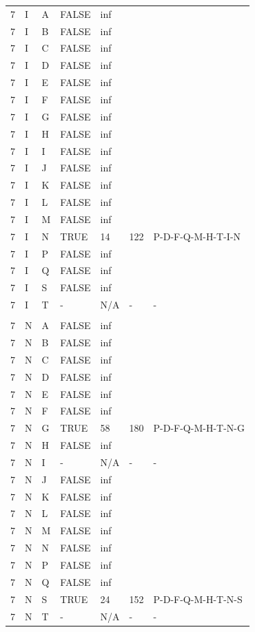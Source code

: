 \documentclass[11pt]{book}
\renewcommand{\=}[1]{\stackrel{#1}{=}} %
\theoremstyle{definition}
\theoremstyle{remark}
\begin{document}
\begin{longtable}{lllllll}
7 & I & A & FALSE & inf &  &  \\
7 & I & B & FALSE & inf &  &  \\
7 & I & C & FALSE & inf &  &  \\
7 & I & D & FALSE & inf &  &  \\
7 & I & E & FALSE & inf &  &  \\
7 & I & F & FALSE & inf &  &  \\
7 & I & G & FALSE & inf &  &  \\
7 & I & H & FALSE & inf &  &  \\
7 & I & I & FALSE & inf &  &  \\
7 & I & J & FALSE & inf &  &  \\
7 & I & K & FALSE & inf &  &  \\
7 & I & L & FALSE & inf &  &  \\
7 & I & M & FALSE & inf &  &  \\
7 & I & N & TRUE & 14 & \cellcolor[HTML]{67FD9A} 122 & \cellcolor[HTML]{67FD9A} P-D-F-Q-M-H-T-I-N \\
7 & I & P & FALSE & inf &  &  \\
7 & I & Q & FALSE & inf &  &  \\
7 & I & S & FALSE & inf &  &  \\
7 & I & T & - & N/A & - & - \\
 &  &  &  &  &  &  \\
7 & N & A & FALSE & inf &  &  \\
7 & N & B & FALSE & inf &  &  \\
7 & N & C & FALSE & inf &  &  \\
7 & N & D & FALSE & inf &  &  \\
7 & N & E & FALSE & inf &  &  \\
7 & N & F & FALSE & inf &  &  \\
7 & N & G & TRUE & 58 & 180 & P-D-F-Q-M-H-T-N-G \\
7 & N & H & FALSE & inf &  &  \\
7 & N & I & - & N/A & - & - \\
7 & N & J & FALSE & inf &  &  \\
7 & N & K & FALSE & inf &  &  \\
7 & N & L & FALSE & inf &  &  \\
7 & N & M & FALSE & inf &  &  \\
7 & N & N & FALSE & inf &  &  \\
7 & N & P & FALSE & inf &  &  \\
7 & N & Q & FALSE & inf &  &  \\
7 & N & S & TRUE & 24 & 152 & P-D-F-Q-M-H-T-N-S \\
7 & N & T & - & N/A & - & -
\end{longtable}
\end{document}
